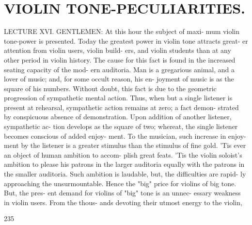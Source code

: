 \documentclass{article}
\begin{document}
\section*{VIOLIN TONE-PECULIARITIES.}
LECTURE XVI. GENTLEMEN: At this hour the subject of maxi- mum violin tone-power is presented. Today the greatest power in violin tone attracts great- er attention from violin users, violin build- ers, and violin students than at any other period in violin history. The cause for this fact is found in the increased seating capacity of the mod- ern auditoria. Man is a gregarious animal, and a lover of music; and, for some occult reason, his en- joyment of music is as the square of his numbers. Without doubt, this fact is due to the geometric progression of sympathetic mental action. Thus, when but a single listener is present at rehearsal, sympathetic action remains at zero; a fact demon- strated by conspicuous absence of demonstration. Upon addition of another listener, sympathetic ac- tion develops as the square of two; whereat, the single listener becomes conscious of added enjoy- ment. To the musician, such increase in enjoy- ment by the listener is a greater stimulus than the stimulus of fine gold. 'Tis ever an object of human ambition to accom- plish great feats. 'Tis the violin soloist's ambition to please his patrons in the larger auditoria equally with the patrons in the smaller auditoria. Such ambition is laudable, but, the difficulties are rapid- ly approaching the unsurmountable. Hence the "big" price for violins of big tone. But, the pres- ent demand for violins of "big" tone is an unnec- essary weakness in violin users. From the thous- ands devoting their utmost energy to the violin,

235
\end{document}
